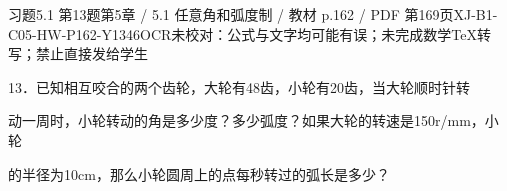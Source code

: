 \begin{bankitem}{习题5.1 第13题}{第5章 / 5.1 任意角和弧度制 / 教材 p.162 / PDF 第169页}{XJ-B1-C05-HW-P162-Y1346}{OCR未校对：公式与文字均可能有误；未完成数学TeX转写；禁止直接发给学生}
\begin{ocrdraft}
\par
13．已知相互咬合的两个齿轮，大轮有48齿，小轮有20齿，当大轮顺时针转
\par
动一周时，小轮转动的角是多少度？多少弧度？如果大轮的转速是150r/mm，小轮
\par
的半径为10cm，那么小轮圆周上的点每秒转过的弧长是多少？
\end{ocrdraft}
\end{bankitem}
